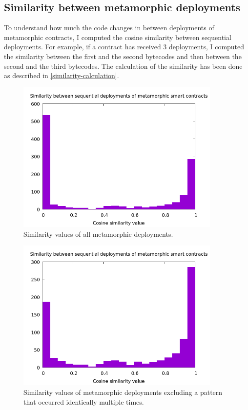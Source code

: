 \subsection{Similarity between metamorphic deployments}

To understand how much the code changes in between deployments of metamorphic contracts, I computed the cosine similarity between sequential deployments. For example, if a contract has received 3 deployments, I computed the similarity between the first and the second bytecodes and then between the second and the third bytecodes. The calculation of the similarity has been done as described in \cref{similarity-calculation}.

\begin{figure}
    \centering
    \includegraphics[width=0.9\textwidth]{Figures/analysis/metamorphic-similarities.png}
    \caption{Similarity values of all metamorphic deployments.}
    \label{fig:metamorphic-similarities}
\end{figure}
\begin{figure}
    \centering
    \includegraphics[width=0.9\textwidth]{Figures/analysis/metamorphic-similarities-no-pattern.png}
    \caption{Similarity values of metamorphic deployments excluding a pattern that occurred identically multiple times.}
    \label{fig:metamorphic-similarities-no-pattern}
\end{figure}

